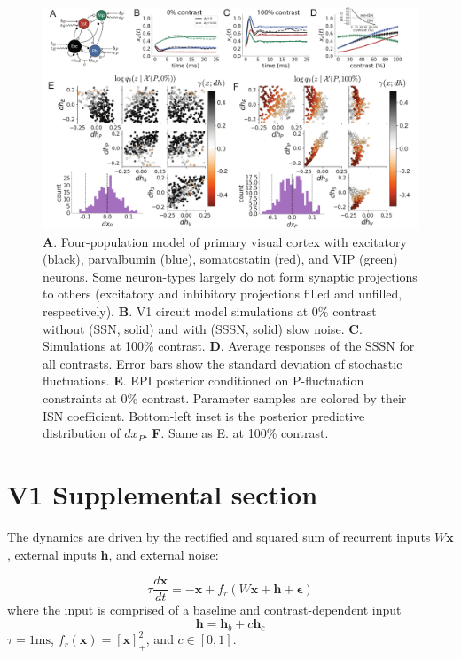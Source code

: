 \documentclass[11pt]{article}
\begin{document}
\clearpage
\begin{figure}[h]
\caption{\small \textbf{A}.  Four-population model of primary visual cortex with excitatory (black), parvalbumin (blue), somatostatin (red), and VIP (green) neurons.   Some neuron-types largely do not form synaptic projections to others  (excitatory and inhibitory projections filled and unfilled, respectively).
\textbf{B}. V1 circuit model simulations at 0\% contrast without (SSN, solid) and with (SSSN, solid) slow noise.
\textbf{C}. Simulations at 100\% contrast.
\textbf{D}. Average responses of the SSSN for all contrasts.  Error bars show the standard deviation of stochastic fluctuations.
\textbf{E}. EPI posterior conditioned on P-fluctuation constraints at 0\% contrast.
Parameter samples are colored by their ISN coefficient.
Bottom-left inset is the posterior predictive distribution of $dx_P$.
\textbf{F}. Same as E. at 100\% contrast.
 }\label{fig:Fig3}
\begin{center}
\includegraphics[scale=.18]{figs/Fig3/Fig3.pdf}
\end{center}
\end{figure}
\clearpage




\section{V1 Supplemental section}\label{methods_V1}

The dynamics are driven by the rectified and squared sum of recurrent inputs $W\mathbf{x}$, external inputs $\mathbf{h}$, and external noise:

\begin{equation}
    \tau \frac{d\mathbf{x}}{dt} = -\mathbf{x} +f_r(W\mathbf{x} + \mathbf{h} + \mathbf{\epsilon})
\end{equation}
where the input is comprised of a baseline and contrast-dependent input 
\begin{equation}
 \mathbf{h} =  \mathbf{h}_b +  c\mathbf{h}_c
\end{equation} 
$\tau = 1 \text{ms}$, $f_r(\mathbf{x}) = \left[\mathbf{x} \right]_+^2$, and $c \in \left[0, 1\right]$.
\end{document}
